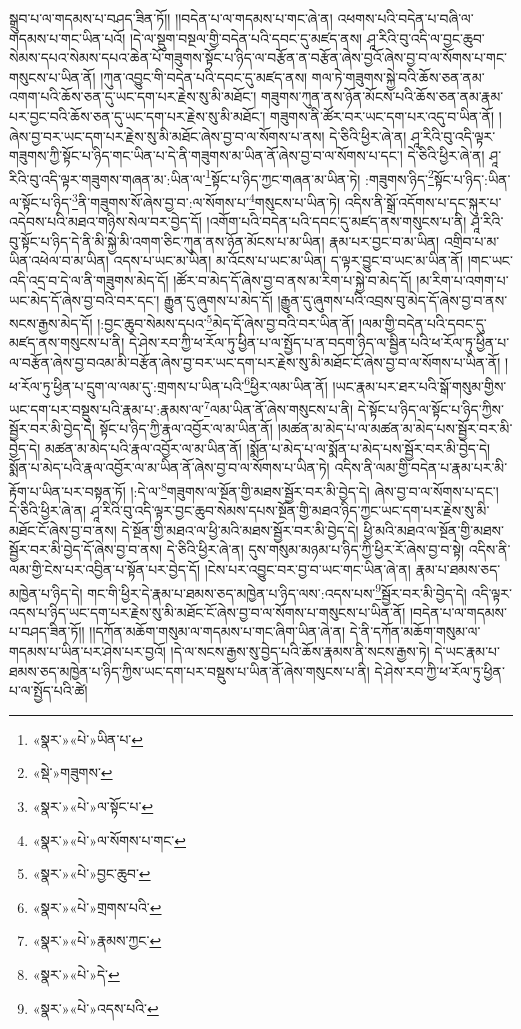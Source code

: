 སྒྲུབ་པ་ལ་གདམས་པ་བཤད་ཟིན་ཏོ།། །།བདེན་པ་ལ་གདམས་པ་གང་ཞེ་ན། འཕགས་པའི་བདེན་པ་བཞི་ལ་གདམས་པ་གང་ཡིན་པའོ། །དེ་ལ་སྡུག་བསྔལ་གྱི་བདེན་པའི་དབང་དུ་མཛད་ནས། ཤཱ་རིའི་བུ་འདི་ལ་བྱང་ཆུབ་སེམས་དཔའ་སེམས་དཔའ་ཆེན་པོ་གཟུགས་སྟོང་པ་ཉིད་ལ་བརྩོན་ན་བརྩོན་ཞེས་བྱའོ་ཞེས་བྱ་བ་ལ་སོགས་པ་གང་གསུངས་པ་ཡིན་ནོ། །ཀུན་འབྱུང་གི་བདེན་པའི་དབང་དུ་མཛད་ནས། གལ་ཏེ་གཟུགས་སྐྱེ་བའི་ཆོས་ཅན་ནམ་འགག་པའི་ཆོས་ཅན་དུ་ཡང་དག་པར་རྗེས་སུ་མི་མཐོང་། གཟུགས་ཀུན་ནས་ཉོན་མོངས་པའི་ཆོས་ཅན་ནམ་རྣམ་པར་བྱང་བའི་ཆོས་ཅན་དུ་ཡང་དག་པར་རྗེས་སུ་མི་མཐོང་། གཟུགས་ནི་ཚོར་བར་ཡང་དག་པར་འདུ་བ་ཡིན་ནོ། །ཞེས་བྱ་བར་ཡང་དག་པར་རྗེས་སུ་མི་མཐོང་ཞེས་བྱ་བ་ལ་སོགས་པ་ནས། དེ་ཅིའི་ཕྱིར་ཞེ་ན། ཤཱ་རིའི་བུ་འདི་ལྟར་གཟུགས་ཀྱི་སྟོང་པ་ཉིད་གང་ཡིན་པ་དེ་ནི་གཟུགས་མ་ཡིན་ནོ་ཞེས་བྱ་བ་ལ་སོགས་པ་དང་། དེ་ཅིའི་ཕྱིར་ཞེ་ན། ཤཱ་རིའི་བུ་འདི་ལྟར་གཟུགས་གཞན་མ་:ཡིན་ལ་\footnote{«སྣར་»«པེ་»ཡིན་པ་}སྟོང་པ་ཉིད་ཀྱང་གཞན་མ་ཡིན་ཏེ། :གཟུགས་ཉིད་\footnote{«སྡེ་»གཟུགས་}སྟོང་པ་ཉིད་:ཡིན་ལ་སྟོང་པ་ཉིད་\footnote{«སྣར་»«པེ་»ལ་སྟོང་པ་}ནི་གཟུགས་སོ་ཞེས་བྱ་བ་:ལ་སོགས་པ་\footnote{«སྣར་»«པེ་»ལ་སོགས་པ་གང་}གསུངས་པ་ཡིན་ཏེ། འདིས་ནི་སྒྲོ་འདོགས་པ་དང་སྐུར་པ་འདེབས་པའི་མཐའ་གཉིས་སེལ་བར་བྱེད་དོ། །འགོག་པའི་བདེན་པའི་དབང་དུ་མཛད་ནས་གསུངས་པ་ནི། ཤཱ་རིའི་བུ་སྟོང་པ་ཉིད་དེ་ནི་མི་སྐྱེ་མི་འགག་ཅིང་ཀུན་ནས་ཉོན་མོངས་པ་མ་ཡིན། རྣམ་པར་བྱང་བ་མ་ཡིན། འགྲིབ་པ་མ་ཡིན་འཕེལ་བ་མ་ཡིན། འདས་པ་ཡང་མ་ཡིན། མ་འོངས་པ་ཡང་མ་ཡིན། ད་ལྟར་བྱུང་བ་ཡང་མ་ཡིན་ནོ། །གང་ཡང་འདི་འདྲ་བ་དེ་ལ་ནི་གཟུགས་མེད་དོ། །ཚོར་བ་མེད་དོ་ཞེས་བྱ་བ་ནས་མ་རིག་པ་སྐྱེ་བ་མེད་དོ། །མ་རིག་པ་འགག་པ་ཡང་མེད་དོ་ཞེས་བྱ་བའི་བར་དང་། རྒྱུན་དུ་ཞུགས་པ་མེད་དོ། །རྒྱུན་དུ་ཞུགས་པའི་འབྲས་བུ་མེད་དོ་ཞེས་བྱ་བ་ནས་སངས་རྒྱས་མེད་དོ། །:བྱང་ཆུབ་སེམས་དཔའ་\footnote{«སྣར་»«པེ་»བྱང་ཆུབ་}མེད་དོ་ཞེས་བྱ་བའི་བར་ཡིན་ནོ། །ལམ་གྱི་བདེན་པའི་དབང་དུ་མཛད་ནས་གསུངས་པ་ནི། དེ་ཤེས་རབ་ཀྱི་ཕ་རོལ་ཏུ་ཕྱིན་པ་ལ་སྤྱོད་པ་ན་བདག་ཉིད་ལ་སྦྱིན་པའི་ཕ་རོལ་ཏུ་ཕྱིན་པ་ལ་བརྩོན་ཞེས་བྱ་བའམ་མི་བརྩོན་ཞེས་བྱ་བར་ཡང་དག་པར་རྗེས་སུ་མི་མཐོང་ངོ་ཞེས་བྱ་བ་ལ་སོགས་པ་ཡིན་ནོ། །ཕ་རོལ་ཏུ་ཕྱིན་པ་དྲུག་ལ་ལམ་དུ་:གྲགས་པ་ཡིན་པའི་\footnote{«སྣར་»«པེ་»གྲགས་པའི་}ཕྱིར་ལམ་ཡིན་ནོ། །ཡང་རྣམ་པར་ཐར་པའི་སྒོ་གསུམ་གྱིས་ཡང་དག་པར་བསྡུས་པའི་རྣམ་པ་:རྣམས་ལ་\footnote{«སྣར་»«པེ་»རྣམས་ཀྱང་}ལམ་ཡིན་ནོ་ཞེས་གསུངས་པ་ནི། དེ་སྟོང་པ་ཉིད་ལ་སྟོང་པ་ཉིད་ཀྱིས་སྦྱོར་བར་མི་བྱེད་དེ། སྟོང་པ་ཉིད་ཀྱི་རྣལ་འབྱོར་ལ་མ་ཡིན་ནོ། །མཚན་མ་མེད་པ་ལ་མཚན་མ་མེད་པས་སྦྱོར་བར་མི་བྱེད་དེ། མཚན་མ་མེད་པའི་རྣལ་འབྱོར་ལ་མ་ཡིན་ནོ། །སྨོན་པ་མེད་པ་ལ་སྨོན་པ་མེད་པས་སྦྱོར་བར་མི་བྱེད་དེ། སྨོན་པ་མེད་པའི་རྣལ་འབྱོར་ལ་མ་ཡིན་ནོ་ཞེས་བྱ་བ་ལ་སོགས་པ་ཡིན་ཏེ། འདིས་ནི་ལམ་གྱི་བདེན་པ་རྣམ་པར་མི་རྟོག་པ་ཡིན་པར་བསྟན་ཏོ། །:དེ་ལ་\footnote{«སྣར་»«པེ་»དེ་}གཟུགས་ལ་སྔོན་གྱི་མཐས་སྦྱོར་བར་མི་བྱེད་དེ། ཞེས་བྱ་བ་ལ་སོགས་པ་དང་། དེ་ཅིའི་ཕྱིར་ཞེ་ན། ཤཱ་རིའི་བུ་འདི་ལྟར་བྱང་ཆུབ་སེམས་དཔས་སྔོན་གྱི་མཐའ་ཉིད་ཀྱང་ཡང་དག་པར་རྗེས་སུ་མི་མཐོང་ངོ་ཞེས་བྱ་བ་ནས། དེ་སྔོན་གྱི་མཐའ་ལ་ཕྱི་མའི་མཐས་སྦྱོར་བར་མི་བྱེད་དེ། ཕྱི་མའི་མཐའ་ལ་སྔོན་གྱི་མཐས་སྦྱོར་བར་མི་བྱེད་དོ་ཞེས་བྱ་བ་ནས། དེ་ཅིའི་ཕྱིར་ཞེ་ན། དུས་གསུམ་མཉམ་པ་ཉིད་ཀྱི་ཕྱིར་རོ་ཞེས་བྱ་བ་སྟེ། འདིས་ནི་ལམ་གྱི་ངེས་པར་འབྱིན་པ་སྟོན་པར་བྱེད་དོ། །ངེས་པར་འབྱུང་བར་བྱ་བ་ཡང་གང་ཡིན་ཞེ་ན། རྣམ་པ་ཐམས་ཅད་མཁྱེན་པ་ཉིད་དེ། གང་གི་ཕྱིར་དེ་རྣམ་པ་ཐམས་ཅད་མཁྱེན་པ་ཉིད་ལས་:འདས་པས་\footnote{«སྣར་»«པེ་»འདས་པའི་}སྦྱོར་བར་མི་བྱེད་དེ། འདི་ལྟར་འདས་པ་ཉིད་ཡང་དག་པར་རྗེས་སུ་མི་མཐོང་ངོ་ཞེས་བྱ་བ་ལ་སོགས་པ་གསུངས་པ་ཡིན་ནོ། །བདེན་པ་ལ་གདམས་པ་བཤད་ཟིན་ཏོ།། །།དཀོན་མཆོག་གསུམ་ལ་གདམས་པ་གང་ཞིག་ཡིན་ཞེ་ན། དེ་ནི་དཀོན་མཆོག་གསུམ་ལ་གདམས་པ་ཡིན་པར་ཤེས་པར་བྱའོ། །དེ་ལ་སངས་རྒྱས་སུ་བྱེད་པའི་ཆོས་རྣམས་ནི་སངས་རྒྱས་ཏེ། དེ་ཡང་རྣམ་པ་ཐམས་ཅད་མཁྱེན་པ་ཉིད་ཀྱིས་ཡང་དག་པར་བསྡུས་པ་ཡིན་ནོ་ཞེས་གསུངས་པ་ནི། དེ་ཤེས་རབ་ཀྱི་ཕ་རོལ་ཏུ་ཕྱིན་པ་ལ་སྤྱོད་པའི་ཚེ། 
